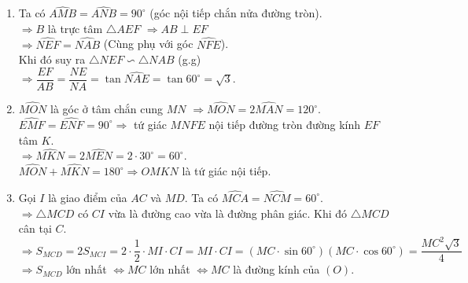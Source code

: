 \begin{ex}
{\begin{center}
\begin{tikzpicture}
  \end{tikzpicture}
 \end{center}
\begin{enumerate}
\item Ta có $\widehat{AMB}=\widehat{ANB}=90^\circ$ (góc nội tiếp chắn nửa đường tròn).\\
$\Rightarrow B$ là trực tâm $\triangle AEF$ $\Rightarrow AB \perp EF$\\
$\Rightarrow\widehat{NEF}=\widehat{NAB}$ (Cùng phụ với góc $\widehat{NFE}$).\\
Khi đó suy ra $\triangle NEF \backsim \triangle NAB$ (g.g) $\Rightarrow \dfrac{EF}{AB}=\dfrac{NE}{NA}=\tan \widehat{NAE}=\tan 60^\circ=\sqrt{3}$.
\item $\widehat{MON}$ là góc ở tâm chắn cung $MN$ $\Rightarrow \widehat{MON}=2\widehat{MAN}=120^\circ$.\\
$\widehat{EMF}=\widehat{ENF}=90^\circ\Rightarrow$ tứ giác $MNFE$ nội tiếp đường tròn đường kính $EF$ tâm $K$.\\
$\Rightarrow \widehat{MKN}=2\widehat{ MEN}=2\cdot 30^\circ =60^\circ$.\\
$\widehat{MON}+\widehat{MKN}=180^\circ \Rightarrow OMKN$ là tứ giác nội tiếp.
\item Gọi $I$ là giao điểm của $AC$ và $MD$. Ta có $\widehat{MCA}=\widehat{NCM}=60^\circ$.\\
$\Rightarrow \triangle MCD$ có $CI$ vừa là đường cao vừa là đường phân giác. Khi đó $\triangle MCD$ cân tại $C$.\\
$\Rightarrow S_{MCD}=2S_{MCI}=2\cdot\dfrac{1}{2}\cdot MI \cdot CI =MI \cdot CI= (MC\cdot \sin 60^\circ)(MC\cdot\cos 60^\circ)=\dfrac{MC^2\sqrt{3}}{4}$\\
$\Rightarrow S_{MCD}$ lớn nhất $\Leftrightarrow  MC$ lớn nhất $\Leftrightarrow MC$ là đường kính của $(O)$.
\end{enumerate}
}
\end{ex}

